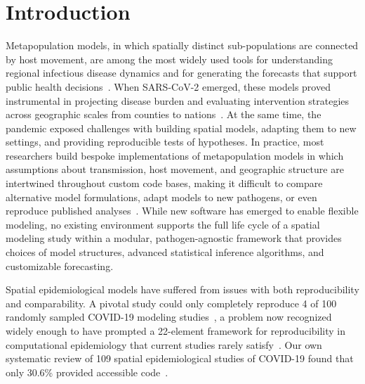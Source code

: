 \section{Introduction}\label{sec:intro}

Metapopulation models, in which spatially distinct sub-populations are connected by host movement, are among the most widely used tools for understanding regional infectious disease dynamics and for generating the forecasts that support public health decisions~\citep{grenfell_metapopulation_1997,keeling_modeling_2011,riley_large-scale_2007,rohani_opposite_1999}. 
When SARS-CoV-2 emerged, these models proved instrumental in projecting disease burden and evaluating intervention strategies across geographic scales from counties to nations~\citep{pei_differential_2020,cramer_evaluation_2022,bertozzi_challenges_2020}. 
At the same time, the pandemic exposed challenges with building spatial models, adapting them to new settings, and providing reproducible tests of hypotheses.
In practice, most researchers build bespoke implementations of metapopulation models in which assumptions about transmission, host movement, and geographic structure are intertwined throughout custom code bases, making it difficult to compare alternative model formulations, adapt models to new pathogens, or even reproduce published analyses~\citep{willem_lessons_2017,pollett_recommended_2021}.
While new software has emerged to enable flexible modeling, no existing environment supports the full life cycle of a spatial modeling study within a modular, pathogen-agnostic framework that provides choices of model structures, advanced statistical inference algorithms, and customizable forecasting.

Spatial epidemiological models have suffered from issues with both reproducibility and comparability. 
A pivotal study could only completely reproduce 4 of 100 randomly sampled COVID-19 modeling studies~\citep{henderson_reproducibility_2024}, a problem now recognized widely enough to have prompted a 22-element framework for reproducibility in computational epidemiology that current studies rarely satisfy~\citep{pokutnaya_implementation_2023}. 
Our own systematic review of 109 spatial epidemiological studies of COVID-19 found that only 30.6\% provided accessible code~\citep{oshinubi_systematic_2026}.

